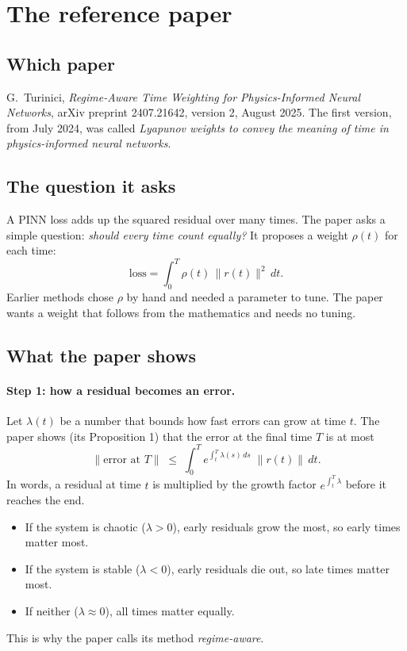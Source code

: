 \documentclass[11pt,a4paper]{article}
\begin{document}
\section{The reference paper}
\label{sec:reference}

\subsection{Which paper}
G.~Turinici, \emph{Regime-Aware Time Weighting for Physics-Informed Neural
Networks}, arXiv preprint 2407.21642, version 2, August 2025. The first version, from July 2024, was called
\emph{Lyapunov weights to convey the meaning of time in physics-informed neural networks}.

\subsection{The question it asks}
A PINN loss adds up the squared residual over many times. The paper asks a simple question:
\emph{should every time count equally?} It proposes a weight $\rho(t)$ for each time:
\[
 \text{loss} = \int_0^T \rho(t)\,\|r(t)\|^2\,dt .
\]
Earlier methods chose $\rho$ by hand and needed a parameter to tune. The paper wants a
weight that follows from the mathematics and needs no tuning.

\subsection{What the paper shows}
\paragraph{Step 1: how a residual becomes an error.} Let $\lambda(t)$ be a number that
bounds how fast errors can grow at time $t$. The paper shows (its Proposition 1) that the
error at the final time $T$ is at most
\[
 \|\text{error at } T\| \;\le\; \int_0^T e^{\int_t^T \lambda(s)\,ds}\;\|r(t)\|\,dt .
\]
In words, a residual at time $t$ is multiplied by the growth factor
$e^{\int_t^T\lambda}$ before it reaches the end.
\begin{itemize}
\item If the system is chaotic ($\lambda>0$), early residuals grow the most, so early times
  matter most.
\item If the system is stable ($\lambda<0$), early residuals die out, so late times matter
  most.
\item If neither ($\lambda\approx0$), all times matter equally.
\end{itemize}
This is why the paper calls its method \emph{regime-aware}.
\end{document}
